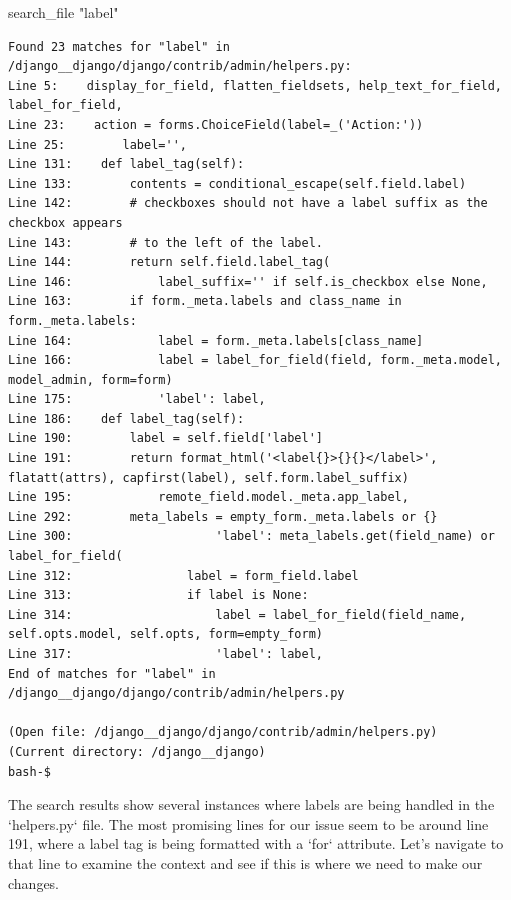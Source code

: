 {\begin{agentbox}
\hrulefill
\begin{CodeVerbatim}[breaklines=true, breakanywhere=true]
search_file "label"
\end{CodeVerbatim}
\end{agentbox}
\begin{observationbox}\begin{Verbatim}[breaklines=true, breakanywhere=true]
Found 23 matches for "label" in /django__django/django/contrib/admin/helpers.py:
Line 5:    display_for_field, flatten_fieldsets, help_text_for_field, label_for_field,
Line 23:    action = forms.ChoiceField(label=_('Action:'))
Line 25:        label='',
Line 131:    def label_tag(self):
Line 133:        contents = conditional_escape(self.field.label)
Line 142:        # checkboxes should not have a label suffix as the checkbox appears
Line 143:        # to the left of the label.
Line 144:        return self.field.label_tag(
Line 146:            label_suffix='' if self.is_checkbox else None,
Line 163:        if form._meta.labels and class_name in form._meta.labels:
Line 164:            label = form._meta.labels[class_name]
Line 166:            label = label_for_field(field, form._meta.model, model_admin, form=form)
Line 175:            'label': label,
Line 186:    def label_tag(self):
Line 190:        label = self.field['label']
Line 191:        return format_html('<label{}>{}{}</label>', flatatt(attrs), capfirst(label), self.form.label_suffix)
Line 195:            remote_field.model._meta.app_label,
Line 292:        meta_labels = empty_form._meta.labels or {}
Line 300:                    'label': meta_labels.get(field_name) or label_for_field(
Line 312:                label = form_field.label
Line 313:                if label is None:
Line 314:                    label = label_for_field(field_name, self.opts.model, self.opts, form=empty_form)
Line 317:                    'label': label,
End of matches for "label" in /django__django/django/contrib/admin/helpers.py

(Open file: /django__django/django/contrib/admin/helpers.py)
(Current directory: /django__django)
bash-$
\end{Verbatim}
\end{observationbox}
\begin{agentbox}
The search results show several instances where labels are being handled in the `helpers.py` file. The most promising lines for our issue seem to be around line 191, where a label tag is being formatted with a `for` attribute. Let's navigate to that line to examine the context and see if this is where we need to make our changes.




\end{agentbox}}
